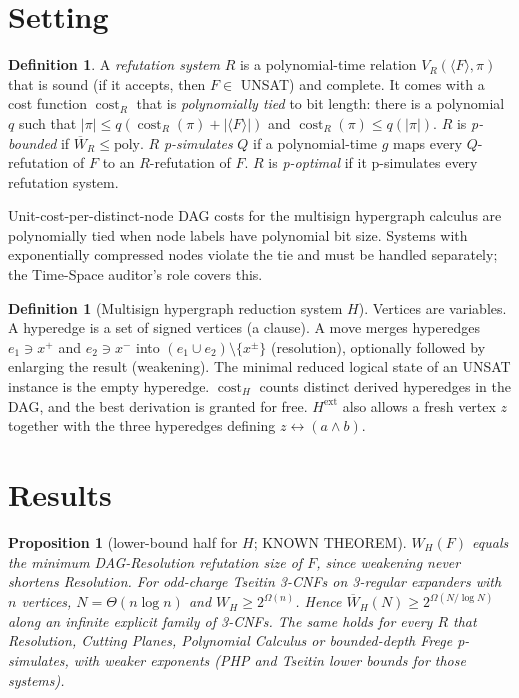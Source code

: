 \documentclass[11pt]{article}
\newtheorem{proposition}[theorem]{Proposition}
\theoremstyle{definition}
\newtheorem{definition}[theorem]{Definition}
\theoremstyle{remark}
\newcommand{\Wbar}{\overline{W}}
\begin{document}
\section{Setting}
\begin{definition}
A \emph{refutation system} $R$ is a polynomial-time relation $V_R(\langle F\rangle,\pi)$ that is sound (if it accepts, then $F\in$ UNSAT) and complete. It comes with a cost function $\operatorname{cost}_R$ that is \emph{polynomially tied} to bit length: there is a polynomial $q$ such that $|\pi|\le q(\operatorname{cost}_R(\pi)+|\langle F\rangle|)$ and $\operatorname{cost}_R(\pi)\le q(|\pi|)$. $R$ is \emph{p-bounded} if $\Wbar_R\le\mathrm{poly}$. $R$ \emph{p-simulates} $Q$ if a polynomial-time $g$ maps every $Q$-refutation of $F$ to an $R$-refutation of $F$. $R$ is \emph{p-optimal} if it p-simulates every refutation system.
\end{definition}
Unit-cost-per-distinct-node DAG costs for the multisign hypergraph calculus are polynomially tied when node labels have polynomial bit size. Systems with exponentially compressed nodes violate the tie and must be handled separately; the Time-Space auditor's role covers this.

\begin{definition}[Multisign hypergraph reduction system $H$]
Vertices are variables. A hyperedge is a set of signed vertices (a clause). A move merges hyperedges $e_1\ni x^{+}$ and $e_2\ni x^{-}$ into $(e_1\cup e_2)\setminus\{x^{\pm}\}$ (resolution), optionally followed by enlarging the result (weakening). The minimal reduced logical state of an UNSAT instance is the empty hyperedge. $\operatorname{cost}_H$ counts distinct derived hyperedges in the DAG, and the best derivation is granted for free. $H^{\mathrm{ext}}$ also allows a fresh vertex $z$ together with the three hyperedges defining $z\leftrightarrow(a\wedge b)$.
\end{definition}

\section{Results}
\begin{proposition}[lower-bound half for $H$; KNOWN THEOREM]\label{p:lb}
$W_H(F)$ equals the minimum DAG-Resolution refutation size of $F$, since weakening never shortens Resolution. For odd-charge Tseitin 3-CNFs on 3-regular expanders with $n$ vertices, $N=\Theta(n\log n)$ and $W_H\ge 2^{\Omega(n)}$. Hence $\Wbar_H(N)\ge 2^{\Omega(N/\log N)}$ along an infinite explicit family of 3-CNFs. The same holds for every $R$ that Resolution, Cutting Planes, Polynomial Calculus or bounded-depth Frege p-simulates, with weaker exponents (PHP and Tseitin lower bounds for those systems).
\end{proposition}
\end{document}
